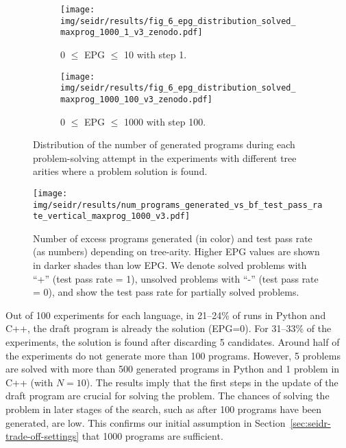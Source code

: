 \begin{figure}[t]
\begin{subfigure}[t]{\columnwidth}
\centering
\texttt{[image: img/seidr/results/fig\_6\_epg\_distribution\_solved\_maxprog\_1000\_1\_v3\_zenodo.pdf]}
  \caption{0 $\leq$ EPG $\leq$ 10 with step 1.}
  \label{fig:seidr:epg-distrib-solved-10}
\end{subfigure}


\begin{subfigure}[t]{\columnwidth}
\centering
\texttt{[image: img/seidr/results/fig\_6\_epg\_distribution\_solved\_maxprog\_1000\_100\_v3\_zenodo.pdf]}
  \caption{0 $\leq$ EPG $\leq$ 1000 with step 100.}
  \label{fig:seidr:epg-distrib-solved-100}
\end{subfigure}
\caption{Distribution of the number of generated programs during each problem-solving attempt in the experiments with different tree arities where a problem solution is found.}
\label{fig:seidr:epg-distribution}
\vspace{-2ex}
\end{figure}

\begin{figure*}[t]
  \centering
  \texttt{[image: img/seidr/results/num\_programs\_generated\_vs\_bf\_test\_pass\_rate\_vertical\_maxprog\_1000\_v3.pdf]}
  \caption{Number of excess programs generated (in color) and test pass rate (as numbers) depending on tree-arity. Higher EPG values are shown in darker shades than low EPG. We denote solved problems with ``+'' (test pass rate = 1), unsolved problems with ``-'' (test pass rate = 0), and show the test pass rate for partially solved problems. }
  \label{fig:seidr:epg-bf}
  \vspace*{-3ex}
\end{figure*}
Out of 100 experiments for each language, in 21--24\% of runs in Python and C++, the draft program is already the solution (EPG=0). 
For 31--33\% of the experiments, the solution is found after discarding 5 candidates. 
Around half of the experiments do not generate more than 100 programs. 
However, 5 problems are solved with more than 500 generated programs in Python and 1 problem in C++ (with $N=10$).
The results imply that the first steps in the update of the draft program are crucial for solving the problem. 
The chances of solving the problem in later stages of the search, such as after 100 programs have been generated, are low.
This confirms our initial assumption in Section~\ref{sec:seidr-trade-off-settings} that 1000 programs are sufficient.

